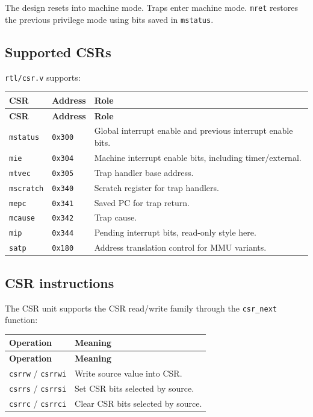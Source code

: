 The design resets into machine mode. Traps enter machine mode. \texttt{mret} restores the previous privilege mode using bits saved in \texttt{mstatus}.

\subsection{Supported CSRs}

\texttt{rtl/csr.v} supports:

\begin{longtable}{|>{\RaggedRight\arraybackslash}p{}|>{\RaggedRight\arraybackslash}p{}|>{\RaggedRight\arraybackslash}p{}|}
\hline
\textbf{CSR} & \textbf{Address} & \textbf{Role} \\
\hline
\endfirsthead
\hline
\textbf{CSR} & \textbf{Address} & \textbf{Role} \\
\hline
\endhead
\texttt{mstatus} & \texttt{0x300} & Global interrupt enable and previous interrupt enable bits. \\
\hline
\texttt{mie} & \texttt{0x304} & Machine interrupt enable bits, including timer/external. \\
\hline
\texttt{mtvec} & \texttt{0x305} & Trap handler base address. \\
\hline
\texttt{mscratch} & \texttt{0x340} & Scratch register for trap handlers. \\
\hline
\texttt{mepc} & \texttt{0x341} & Saved PC for trap return. \\
\hline
\texttt{mcause} & \texttt{0x342} & Trap cause. \\
\hline
\texttt{mip} & \texttt{0x344} & Pending interrupt bits, read-only style here. \\
\hline
\texttt{satp} & \texttt{0x180} & Address translation control for MMU variants. \\
\hline
\end{longtable}

\subsection{CSR instructions}

The CSR unit supports the CSR read/write family through the \texttt{csr\_next} function:

\begin{longtable}{|>{\RaggedRight\arraybackslash}p{}|>{\RaggedRight\arraybackslash}p{}|}
\hline
\textbf{Operation} & \textbf{Meaning} \\
\hline
\endfirsthead
\hline
\textbf{Operation} & \textbf{Meaning} \\
\hline
\endhead
\texttt{csrrw} / \texttt{csrrwi} & Write source value into CSR. \\
\hline
\texttt{csrrs} / \texttt{csrrsi} & Set CSR bits selected by source. \\
\hline
\texttt{csrrc} / \texttt{csrrci} & Clear CSR bits selected by source. \\
\hline
\end{longtable}

